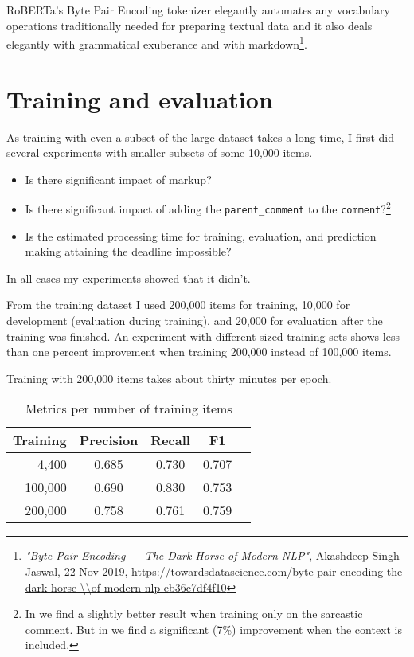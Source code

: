 \documentclass[11pt,a4paper]{article}
\begin{document}
RoBERTa's Byte Pair Encoding tokenizer elegantly automates any vocabulary operations traditionally needed for preparing textual data and it also deals elegantly with grammatical exuberance and with markdown\footnote{\textit{"Byte Pair Encoding — The Dark Horse of Modern NLP"}, Akashdeep Singh Jaswal, 22 Nov 2019, \url{https://towardsdatascience.com/byte-pair-encoding-the-dark-horse-\\of-modern-nlp-eb36c7df4f10}}.\par

\section{Training and evaluation}

As training with even a subset of the large dataset takes a long time, I first did several experiments with smaller subsets of some 10,000 items.
\begin{itemize}
\item{Is there significant impact of markup?}
\item{Is there significant impact of adding the \texttt{parent\_comment} to the \texttt{comment}?\footnote{In \cite{a-d-2020-sarcasm} we find a slightly better result when training only on the sarcastic comment. But in \cite{dong-etal-2020-transformer} we find a significant (7\%) improvement when the context is included.}}
\item{Is the estimated processing time for training, evaluation, and prediction making attaining the deadline impossible?}
\end{itemize}

In all cases my experiments showed that it didn't.

From the training dataset I used 200,000 items for training,  10,000 for development (evaluation during training), and 20,000 for evaluation after the training was finished.  An experiment with different sized training sets shows less than one percent improvement when training 200,000 instead of 100,000 items.\par

Training with 200,000 items takes about thirty minutes per epoch.\par

\begin{table}[ht]
\centering %
\begin{tabular}{r c c c l} 
\hline \textbf{Training} & \textbf{Precision}  & \textbf{Recall} & \textbf{F1} \\ 
\hline
  4,400 & 0.685 & 0.730 & 0.707 \\
100,000 & 0.690 & 0.830 & 0.753 \\
200,000 & 0.758 & 0.761  & 0.759 \\
\hline %
\end{tabular}
\caption{Metrics per number of training items}
\label{table:result}
\end{table}
\end{document}
